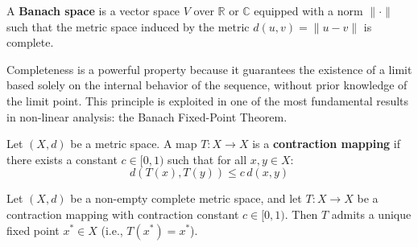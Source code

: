 \begin{definition}
A \textbf{Banach space} is a vector space $V$ over $\mathbb{R}$ or $\mathbb{C}$ equipped with a norm $\|\cdot\|$ such that the metric space induced by the metric $d(u, v) = \|u - v\|$ is complete.
\end{definition}

Completeness is a powerful property because it guarantees the existence of a limit based solely on the internal behavior of the sequence, without prior knowledge of the limit point. This principle is exploited in one of the most fundamental results in non-linear analysis: the Banach Fixed-Point Theorem.

\begin{definition}
Let $(X, d)$ be a metric space. A map $T: X \to X$ is a \textbf{contraction mapping} if there exists a constant $c \in [0, 1)$ such that for all $x, y \in X$:
$$ d(T(x), T(y)) \le c \, d(x, y) $$
\end{definition}

\begin{theorem}
Let $(X, d)$ be a non-empty complete metric space, and let $T: X \to X$ be a contraction mapping with contraction constant $c \in [0, 1)$. Then $T$ admits a unique fixed point $x^* \in X$ (i.e., $T(x^*) = x^*$).
\end{theorem}

